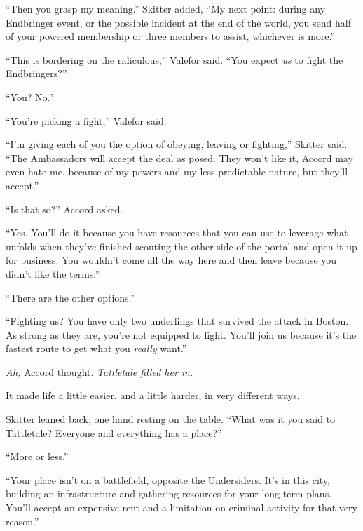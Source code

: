 ``Then you grasp my meaning.'' Skitter added, ``My next point: during any Endbringer event, or the possible incident at the end of the world, you send half of your powered membership or three members to assist, whichever is more.''



``This is bordering on the ridiculous,'' Valefor said.  ``You expect \emph{us} to fight the Endbringers?''



``You?  No.''



``You're picking a fight,'' Valefor said.



``I'm giving each of you the option of obeying, leaving or fighting,'' Skitter said.  ``The Ambassadors will accept the deal as posed.  They won't like it, Accord may even hate me, because of my powers and my less predictable nature, but they'll accept.''



``Is that so?'' Accord asked.



``Yes.  You'll do it because you have resources that you can use to leverage what unfolds when they've finished scouting the other side of the portal and open it up for business.  You wouldn't come all the way here and then leave because you didn't like the terms.''



``There are the other options.''



``Fighting us?  You have only two underlings that survived the attack in Boston.  As strong as they are, you're not equipped to fight.  You'll join us because it's the fastest route to get what you \emph{really} want.''



\emph{Ah,} Accord thought.  \emph{Tattletale filled her in.}



It made life a little easier, and a little harder, in very different ways.



Skitter leaned back, one hand resting on the table.  ``What was it you said to Tattletale?  Everyone and everything has a place?''



``More or less.''



``Your place isn't on a battlefield, opposite the Undersiders.  It's in this city, building an infrastructure and gathering resources for your long term plans.  You'll accept an expensive rent and a limitation on criminal activity for that very reason.''



